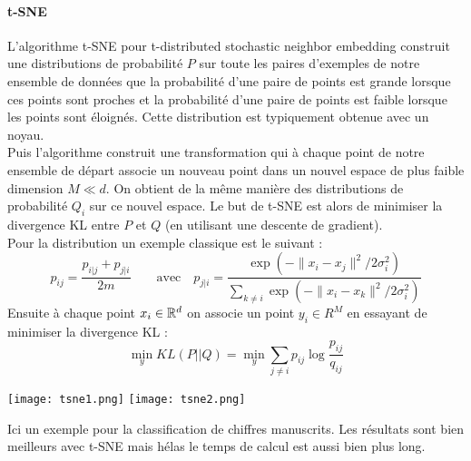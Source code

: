 \paragraph{t-SNE}
L'algorithme t-SNE pour t-distributed stochastic neighbor embedding construit une distributions de probabilité $P$ sur toute les paires d'exemples de notre ensemble de données que la probabilité d'une paire de points est grande lorsque ces points sont proches et la probabilité d'une paire de points est faible lorsque les points sont éloignés. Cette distribution est typiquement obtenue avec un noyau. \\
Puis l'algorithme construit une transformation qui à chaque point de notre ensemble de départ associe un nouveau point dans un nouvel espace de plus faible dimension $M \ll d$. On obtient de la même manière des distributions de probabilité $Q_i$ sur ce nouvel espace. Le but de t-SNE est alors de minimiser la divergence KL entre $P$ et $Q$ (en utilisant une descente de gradient). \\
Pour la distribution un exemple classique est le suivant :
$$ p_{ij} = \dfrac{p_{i|j} + p_{j|i}}{2 m} \qquad \text{avec} \quad p_{j|i} = \dfrac{\exp \left( - \| x_i - x_j \|^2 / 2 \sigma_i^2 \right)}{\sum_{k \neq i} \exp \left( - \| x_i - x_k \|^2 / 2 \sigma_i^2 \right)} $$
Ensuite à chaque point $x_i \in \mathbb{R}^d$ on associe un point $y_i \in R^M$ en essayant de minimiser la divergence KL :
$$ \min_y KL(P || Q) = \min_y \sum_{j \neq i} p_{ij} \log \dfrac{p_{ij}}{q_{ij}} $$
\begin{center}
	\texttt{[image: tsne1.png]}
	\texttt{[image: tsne2.png]}
\end{center}
Ici un exemple pour la classification de chiffres manuscrits. Les résultats sont bien meilleurs avec t-SNE mais hélas le temps de calcul est aussi bien plus long.